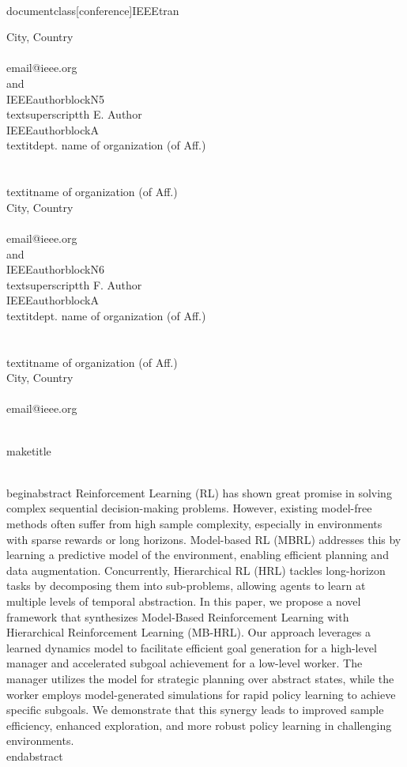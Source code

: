 \\documentclass[conference]{IEEEtran}
\begin{document}
{{City, Country \\\\
email@ieee.org}
\\and
\\IEEEauthorblockN{5\\textsuperscript{th} E. Author}
\\IEEEauthorblockA{\\textit{dept. name of organization (of Aff.)} \\\\
\\textit{name of organization (of Aff.)}\\
City, Country \\\\
email@ieee.org}
\\and
\\IEEEauthorblockN{6\\textsuperscript{th} F. Author}
\\IEEEauthorblockA{\\textit{dept. name of organization (of Aff.)} \\\\
\\textit{name of organization (of Aff.)}\\
City, Country \\\\
email@ieee.org}
}

\\maketitle

\\begin{abstract}
Reinforcement Learning (RL) has shown great promise in solving complex sequential decision-making problems. However, existing model-free methods often suffer from high sample complexity, especially in environments with sparse rewards or long horizons. Model-based RL (MBRL) addresses this by learning a predictive model of the environment, enabling efficient planning and data augmentation. Concurrently, Hierarchical RL (HRL) tackles long-horizon tasks by decomposing them into sub-problems, allowing agents to learn at multiple levels of temporal abstraction. In this paper, we propose a novel framework that synthesizes Model-Based Reinforcement Learning with Hierarchical Reinforcement Learning (MB-HRL). Our approach leverages a learned dynamics model to facilitate efficient goal generation for a high-level manager and accelerated subgoal achievement for a low-level worker. The manager utilizes the model for strategic planning over abstract states, while the worker employs model-generated simulations for rapid policy learning to achieve specific subgoals. We demonstrate that this synergy leads to improved sample efficiency, enhanced exploration, and more robust policy learning in challenging environments.
\\end{abstract}
\end{document}
